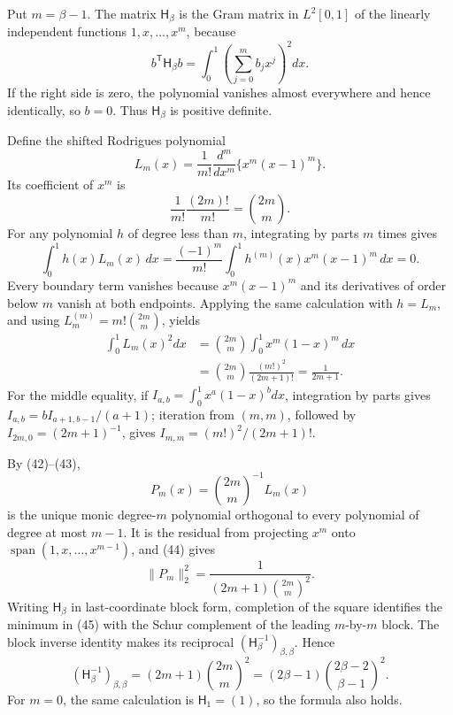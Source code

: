 Put \(m=\beta-1\).  The matrix \(\mathsf H_\beta\) is the Gram matrix in \(L^2[0,1]\) of the linearly independent functions \(1,x,\ldots,x^m\), because
\[
b^{\mathsf T}\mathsf H_\beta b
=\int_0^1\left(\sum_{j=0}^m b_jx^j\right)^2dx.
\]
If the right side is zero, the polynomial vanishes almost everywhere and hence identically, so \(b=0\).  Thus \(\mathsf H_\beta\) is positive definite.

Define the shifted Rodrigues polynomial
\[
L_m(x)=\frac1{m!}\frac{d^m}{dx^m}\{x^m(x-1)^m\}.
\]
Its coefficient of \(x^m\) is
\[
\frac1{m!}\frac{(2m)!}{m!}=\binom{2m}{m}.
\tag{42}
\]
For any polynomial \(h\) of degree less than \(m\), integrating by parts \(m\) times gives
\[
\int_0^1h(x)L_m(x)\,dx
=\frac{(-1)^m}{m!}\int_0^1h^{(m)}(x)x^m(x-1)^m\,dx=0.
\tag{43}
\]
Every boundary term vanishes because \(x^m(x-1)^m\) and its derivatives of order below \(m\) vanish at both endpoints.  Applying the same calculation with \(h=L_m\), and using \(L_m^{(m)}=m!\binom{2m}{m}\), yields
\[
\begin{aligned}
\int_0^1L_m(x)^2dx
&=\binom{2m}{m}\int_0^1x^m(1-x)^m\,dx\\
&=\binom{2m}{m}\frac{(m!)^2}{(2m+1)!}
=\frac1{2m+1}.
\end{aligned}
\tag{44}
\]
For the middle equality, if \(I_{a,b}=\int_0^1x^a(1-x)^b dx\), integration by parts gives \(I_{a,b}=bI_{a+1,b-1}/(a+1)\); iteration from \((m,m)\), followed by \(I_{2m,0}=(2m+1)^{-1}\), gives \(I_{m,m}=(m!)^2/(2m+1)!\).

By (42)--(43),
\[
P_m(x)=\binom{2m}{m}^{-1}L_m(x)
\]
is the unique monic degree-\(m\) polynomial orthogonal to every polynomial of degree at most \(m-1\).  It is the residual from projecting \(x^m\) onto \(\operatorname{span}(1,x,\ldots,x^{m-1})\), and (44) gives
\[
\|P_m\|_2^2
=\frac1{(2m+1)\binom{2m}{m}^2}.
\tag{45}
\]
Writing \(\mathsf H_\beta\) in last-coordinate block form, completion of the square identifies the minimum in (45) with the Schur complement of the leading \(m\)-by-\(m\) block.  The block inverse identity makes its reciprocal \((\mathsf H_\beta^{-1})_{\beta,\beta}\).  Hence
\[
(\mathsf H_\beta^{-1})_{\beta,\beta}
=(2m+1)\binom{2m}{m}^2
=(2\beta-1)\binom{2\beta-2}{\beta-1}^2.
\]
For \(m=0\), the same calculation is \(\mathsf H_1=(1)\), so the formula also holds.